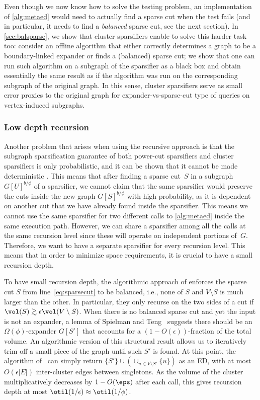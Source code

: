 Even though we now know how to solve the testing problem, an implementation of \cref{alg:metaed} would need to actually find a sparse cut when the test fails (and in particular, it needs to find a \textit{balanced} sparse cut, see the next section). In \cref{sec:balsparse}, we show that cluster sparsifiers enable to solve this harder task too: consider an offline algorithm that either correctly determines a graph to be a boundary-linked expander or finds a (balanced) sparse cut; we show that one can run such algorithm on a subgraph of the sparsifier as a black box and obtain essentially the same result as if the algorithm was run on the corresponding subgraph of the original graph. In this sense, cluster sparsifiers serve as small error proxies to the original graph for expander-vs-sparse-cut type of queries on vertex-induced subgraphs.

\subsubsection*{Low depth recursion}
Another problem that arises when using the recursive approach is that the subgraph sparsification guarantee of both power-cut sparsifiers and cluster sparsifiers is only probabilistic, and it can be shown that it cannot be made deterministic \cite{streamexpdec}. This means that after finding a sparse cut~$S$ in a subgraph $G[U]^{b / \phi}$ of a sparsifier, we cannot claim that the same sparsifier would preserve the cuts inside the new graph $G[S]^{b / \phi}$ with high probability, as it is dependent on another cut that we have already found inside the sparsifier. This means we cannot use the same sparsifier for two different calls to \cref{alg:metaed} inside the same execution path.
However, we can share a sparsifier among all the calls at the same recursion level since these will operate on independent portions of~$G$. Therefore, we want to have a separate sparsifier for every recursion level. This means that in order to minimize space requirements, it is crucial to have a small recursion depth.

To have small recursion depth, the algorithmic approach of \cite{streamexpdec,triang,ChangPSZ21} enforces the sparse cut $S$ from line~\eqref{eq:sparsecut} to be balanced, i.e., none of $S$ and $V\setminus S$ is much larger than the other. In particular, they only recurse on the two sides of a cut if $\vol(S) \gtrsim \epsilon \vol(V \setminus S)$. 
When there is no balanced sparse cut and yet the input is not an expander, a lemma of Spielman and Teng~\cite{stspectral} suggests there should be an $\Omega(\phi)$-expander $G[S']$ that accounts for a $(1-O(\epsilon))$-fraction of the total volume. An algorithmic version of this structural result allows us to iteratively trim off a small piece of the graph until such $S'$ is found. At this point, the algorithm of~\cite{streamexpdec} can simply return $\{S'\} \cup (\cup_{u \in V \setminus S'} \{u\})$ as an ED, with at most $O(\epsilon|E|)$ inter-cluster edges between singletons. As the volume of the cluster multiplicatively decreases by $1 - O(\eps)$ after each call, this gives recursion depth at most $\otil(1/\epsilon) \approx \otil(1/\phi)$.

